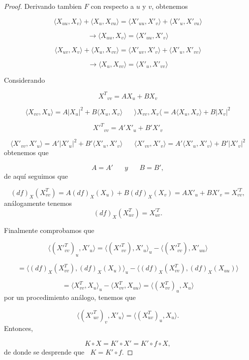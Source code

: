 \begin{proof}
	Derivando tambien $F$ con respecto a $u$ y $v$, obtenemos
	
	\[
		\langle X_{uu}, X_v \rangle + \langle X_u, X_{vu} \rangle = \langle X'_{uu}, X'_v \rangle + \langle X'_u, X'_{vu} \rangle
	\]
	
	\[
		\to \langle X_{uu}, X_v \rangle = \langle X'_{uu}, X'_v \rangle
	\]
	
	\[
		\langle X_{uv}, X_v \rangle + \langle X_u, X_{vv} \rangle = \langle X'_{uv}, X'_v \rangle + \langle X'_u, X'_{vv} \rangle
	\]
	
	\[
		\to \langle X_u, X_{vv} \rangle = \langle X'_u, X'_{vv} \rangle
	\]
	
	Considerando
	
	\[
		{X^T}_{vv} = AX_u + BX_v
	\]
	
	\[
		\langle X_{vv}, X_u \rangle = A|X_u|^2 + B \langle X_u, X_v \rangle \;\;\;\;\;\; \rangle X_{vv}, X_v \langle = A \langle X_u, X_v \rangle + B|X_v|^2
	\]
	
	\[
		{X'^T}_{vv} = A'X'_u + B'X'_v
	\]
	
	\[
		\langle X'_{vv}, X'_u \rangle = A'|X'_u|^2 + B'\langle X'_u, X'_v \rangle \;\;\;\;\;\; \langle X'_{vv}, X'_v \rangle = A' \langle X'_u, X'_v \rangle + B'|X'_v|^2
	\]
	obtenemos que
	
	\[
		A = A' \;\;\;\;\;\; y \;\;\;\;\;\; B = B',
	\]
	de aquí seguimos que
	
	\[
		(df)_X(X^{T}_{vv}) = A(df)_X(X_u) + B(df)_X(X_v) = AX'_u + BX'_v = X^{'T}_{vv},
	\]
	análogamente tenemos
	\[
		(df)_X(X^{T}_{uv}) = X^{'T}_{uv}.
	\]
	
	Finalmente comprobamos que
	
	\[
		\langle (X'^{T}_{vv})_u, X'_u \rangle = \langle (X'^{T}_{vv}), X'_u \rangle _u - \langle (X'^{T}_{vv}), X'_{uu} \rangle
	\]
	
	\[
		= \langle (df)_X(X^{T}_{vv}), (df)_X(X_u) \rangle _u - \langle (df)_X(X^{T}_{vv}), (df)_X(X_{uu}) \rangle
	\]
	
	\[
		= \langle X^{T}_{vv}, X_u \rangle _u - \langle X^{T}_{vv}, X_{uu} \rangle = \langle (X^{T}_{vv})_u, X_u \rangle
	\]
	por un procedimiento análogo, tenemos que
	
	\[
		\langle (X'^{T}_{uv})_v, X'_u \rangle = \langle (X^{T}_{uv})_u, X_u \rangle.
	\]
	${ }$\\	
	
	Entonces,
	
	\[
		K \circ X = K' \circ X' = K' \circ f \circ X,
	\]
	de donde se desprende que   $\;\; K = K' \circ f$.
	
\end{proof}

